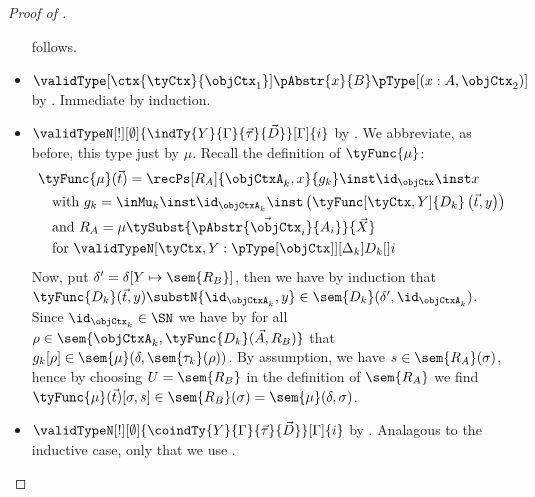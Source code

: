 \documentclass[preprint]{sigplanconf}
\begin{document}
\begin{proof}[Proof of ]
\begin{itemize}
\begin{equation*}
    \end{equation*}
    follows.
  \item $\validType[\ctx{\tyCtx}{\objCtx_1}]{
      \pAbstr{x}{B}}{\pType[(x : A, \objCtx_2)]}$
    by \PAbstr.
    Immediate by induction.
  \item $\validTypeN[!][\emptyset]{
      \indTy{Y}{\Gamma}{\vec{\tau}}{\vec{D}}}[\Gamma]{i}$
    by \FPTy.
    We abbreviate, as before, this type just by $\mu$.
    Recall the definition of $\tyFunc{\mu}$:
    \begin{align*}
      & \tyFunc{\mu}(\vec{t})
      = \recPs[R_A]{\objCtxA_k, x}{g_k} \inst \id_{\objCtx} \inst x \\
      & \quad \text{with } g_k =
      \inMu_k
      \inst \id_{\objCtxA_k} \inst
      \left(\tyFunc[\tyCtx, Y]{D_k}\left(
          \vec{t}, y
        \right)\right) \\
      & \quad \text{and }
      R_A = \mu \tySubst{\vec{\pAbstr{\objCtx_i}{A_i}}}{\vec{X}} \\
      & \quad \text{for }
      \validTypeN[\tyCtx, Y : {\pType[\objCtx]}][\Delta_k]{D_k}[]{i}
    \end{align*}
    Now, put $\delta' = \delta [Y \mapsto \sem{R_B}]$,
    then we have by induction that
    $\tyFunc{D_k}(\vec{t}, y) \substN{\id_{\objCtxA_k}, y}
    \in \sem{D_k}(\delta', \id_{\objCtxA_k})$.
    Since $\id_{\objCtx_k} \in \SN$ we have by 
    for all $\rho \in \sem{\objCtxA_k, \tyFunc{D_k}(\vec{A}, R_B)}$ that
    $g_k [\rho] \in \sem{\mu}(\delta, \sem{\tau_k}(\rho))$.
By assumption, we have $s \in \sem{R_A}(\sigma)$, hence by
    choosing $U = \sem{R_B}$ in the definition of $\sem{R_A}$ we find
    $\tyFunc{\mu}(\vec{t})[\sigma,s] \in
    \sem{R_B}(\sigma) = \sem{\mu}(\delta, \sigma)$.
  \item $\validTypeN[!][\emptyset]{
      \coindTy{Y}{\Gamma}{\vec{\tau}}{\vec{D}}}[\Gamma]{i}$
    by \FPTy.
    Analagous to the inductive case, only that we use .
\end{itemize}
\end{proof}
\end{document}
